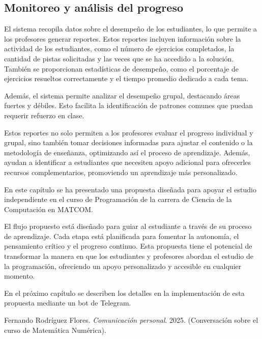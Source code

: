 \documentclass{article}
\begin{document}
\subsection{Monitoreo y análisis del progreso}

El sistema recopila datos sobre el desempeño de los estudiantes, lo que permite a los profesores generar reportes. Estos reportes incluyen información sobre la actividad de los estudiantes, como el número de ejercicios completados, la cantidad de pistas solicitadas y las veces que se ha accedido a la solución. También se proporcionan estadísticas de desempeño, como el porcentaje de ejercicios resueltos correctamente y el tiempo promedio dedicado a cada tema.

Además, el sistema permite analizar el desempeño grupal, destacando áreas fuertes y débiles. Esto facilita la identificación de patrones comunes que puedan requerir refuerzo en clase. 

Estos reportes no solo permiten a los profesores evaluar el progreso individual y grupal, sino también tomar decisiones informadas para ajustar el contenido o la metodología de enseñanza, optimizando así el proceso de aprendizaje. Además, ayudan a identificar a estudiantes que necesiten apoyo adicional para ofrecerles recursos complementarios, promoviendo un aprendizaje más personalizado.

En este capítulo se ha presentado una propuesta diseñada para apoyar el estudio independiente en el curso de Programación de la carrera de Ciencia de la Computación en \mbox{MATCOM}.

El flujo propuesto está diseñado para guiar al estudiante a través de su proceso de aprendizaje. Cada etapa está planificada para fomentar la autonomía, el pensamiento crítico y el progreso continuo. Esta propuesta tiene el potencial de transformar la manera en que los estudiantes y profesores abordan el estudio de la programación, ofreciendo un apoyo personalizado y accesible en cualquier momento.

En el próximo capítulo se describen los detalles en la implementación de esta propuesta mediante un bot de Telegram.

\begin{thebibliography}{99}

    Fernando Rodríguez Flores.
    \textit{Comunicación personal}. 
    2025. 
    (Conversación sobre el curso de Matemática Numérica).
  
\end{thebibliography}
\end{document}
